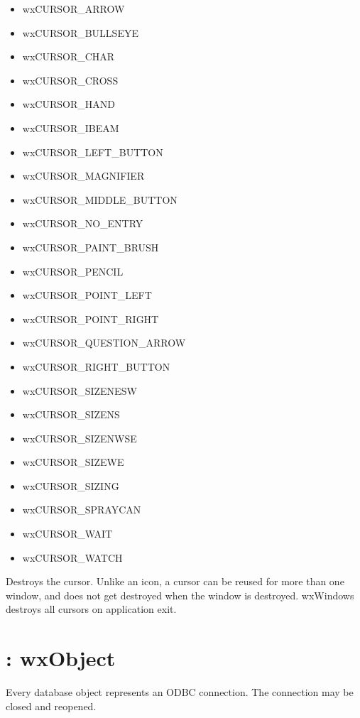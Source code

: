 \begin{itemize}\itemsep=0pt
\item wxCURSOR\_ARROW
\item wxCURSOR\_BULLSEYE
\item wxCURSOR\_CHAR
\item wxCURSOR\_CROSS
\item wxCURSOR\_HAND
\item wxCURSOR\_IBEAM
\item wxCURSOR\_LEFT\_BUTTON
\item wxCURSOR\_MAGNIFIER
\item wxCURSOR\_MIDDLE\_BUTTON
\item wxCURSOR\_NO\_ENTRY
\item wxCURSOR\_PAINT\_BRUSH
\item wxCURSOR\_PENCIL
\item wxCURSOR\_POINT\_LEFT
\item wxCURSOR\_POINT\_RIGHT
\item wxCURSOR\_QUESTION\_ARROW
\item wxCURSOR\_RIGHT\_BUTTON
\item wxCURSOR\_SIZENESW
\item wxCURSOR\_SIZENS
\item wxCURSOR\_SIZENWSE
\item wxCURSOR\_SIZEWE
\item wxCURSOR\_SIZING
\item wxCURSOR\_SPRAYCAN
\item wxCURSOR\_WAIT
\item wxCURSOR\_WATCH
\end{itemize}



Destroys the cursor. Unlike an icon, a cursor can be reused for more
than one window, and does not get destroyed when the window is
destroyed. wxWindows destroys all cursors on application exit.

\section{: wxObject}\label{wxdatabase}


Every database object represents an ODBC connection. The connection may be closed and reopened.

